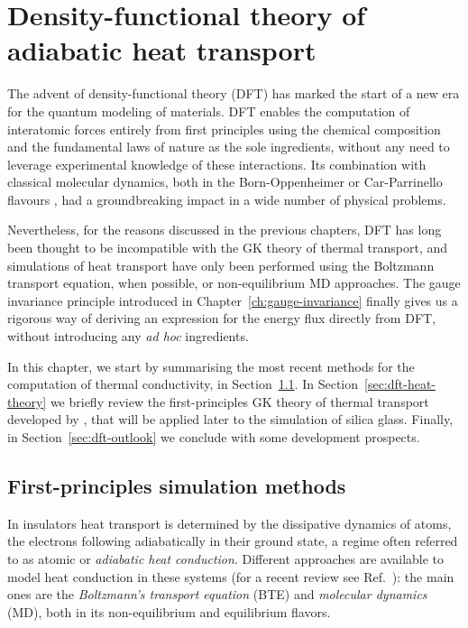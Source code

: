 \chapter{Density-functional theory of adiabatic heat transport} \label{ch:dft-heat}

The advent of density-functional theory (DFT) \cite{Hohenberg1964,Kohn1965,Martin2008} has marked the start of a new era for the quantum modeling of materials. DFT enables the computation of interatomic forces entirely from first principles using the chemical composition and the fundamental laws of nature as the sole ingredients, without any need to leverage experimental knowledge of these interactions.
Its combination with classical molecular dynamics, both in the Born-Oppenheimer or Car-Parrinello flavours \cite{Car1985,Marx2009}, had a groundbreaking impact in a wide number of physical problems.

Nevertheless, for the reasons discussed in the previous chapters, DFT has long been thought to be incompatible with the GK theory of thermal transport, and \abinitio simulations of heat transport have only been performed using the Boltzmann transport equation, when possible, or non-equilibrium MD approaches.
The gauge invariance principle introduced in Chapter~\ref{ch:gauge-invariance} finally gives us a rigorous way of deriving an expression for the energy flux directly from DFT, without introducing any \emph{ad hoc} ingredients. 

In this chapter, we start by summarising the most recent \abinitio methods for the computation of thermal conductivity, in Section~\ref{sec:abinitio-methods}. In Section~\ref{sec:dft-heat-theory} we briefly review the first-principles GK theory of thermal transport developed by \citet{Marcolongo2016}, that will be applied later to the simulation of silica glass. 
Finally, in Section~\ref{sec:dft-outlook} we conclude with some development prospects. 



\newpage
\section{First-principles simulation methods}  \label{sec:abinitio-methods}
In insulators heat transport is determined by the dissipative dynamics of atoms, the electrons following adiabatically in their ground state, a regime often referred to as atomic or \emph{adiabatic heat conduction}. Different approaches are available to model heat conduction in these systems (for a recent review see Ref.~\cite{Fugallo2018}): the main ones are the \emph{Boltzmann's transport equation} (BTE)  %
and \emph{molecular dynamics} (MD), both in its non-equilibrium and equilibrium flavors. 
%

